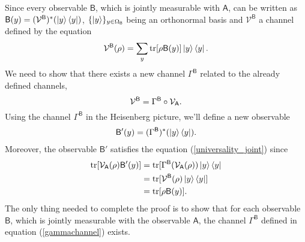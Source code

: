 \documentclass[a4paper,12pt]{wihuri}
\theoremstyle{definition}
\numberwithin{definition}{section}
\numberwithin{example}{section}
\numberwithin{theorem}{section}
\numberwithin{proposition}{section}
\numberwithin{lemma}{section}
\newcommand{\V}{\mathcal{V}}%
\newcommand{\A}{\mathsf{A}}%
\newcommand{\B}{\mathsf{B}}%
\DeclareMathOperator{\tr}{tr}
\begin{document}
Since every observable $\B$, which is jointly measurable with $\A$, can be written as $\B(y) = (\V^{\B})^*(\ket{y}\bra{y})$, $\lbrace\ket{y}\rbrace_{y \in \Omega_\B}$ being an orthonormal basis and $\V^{\B}$ a channel defined by the equation
\begin{align*}
\V^{\B}(\rho) = \sum_y \tr[\rho\B(y)]\ket{y}\bra{y}\text.
\end{align*}
We need to show that there exists a new channel $\Gamma^{\B}$ related to the already defined channels,
\begin{equation}\label{gammachannel}
\V^{\B} = \Gamma^{\B} \circ \V_{\A}\text.
\end{equation}
Using the channel $\Gamma^{\B}$ in the Heisenberg picture, we'll define a new observable
\begin{align*}
\B'(y) = (\Gamma^{\B})^*(\ket{y}\bra{y})\text.
\end{align*}
Moreover, the observable $\B'$ satisfies the equation (\ref{universality_joint}) since
\begin{align*}
\tr[\V_{\A}(\rho)\B'(y)] &= \tr[\Gamma^{\B}(\V_{\A}(\rho))\ket{y}\bra{y} \\
&=\tr[\V^{\B}(\rho)\ket{y}\bra{y}]\\
&= \tr[\rho\B(y)]\text.
\end{align*}
The only thing needed to complete the proof is to show that for each observable $\B$, which is jointly measurable with the observable $\A$, the channel $\Gamma^{\B}$ defined in equation (\ref{gammachannel}) exists.
\end{document}
